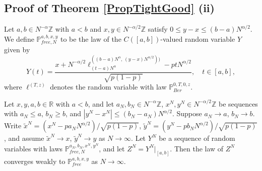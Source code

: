 \subsection{Proof of Theorem \ref{PropTightGood} (ii)}

\begin{definition}\label{scaledRW}
	Let $a,b\in N^{-\alpha}\mathbb{Z}$ with $a<b$ and $x,y\in N^{-\alpha/2}\mathbb{Z}$ satisfy $0\leq y-x \leq (b-a)N^{\alpha/2}$. We define $\mathbb{P}^{a,b,x,y}_{free,N}$ to be the law of the $C([a,b])$-valued random variable $Y$ given by
	\[
	Y(t) = \frac{x + N^{-\alpha/2}\ell^{((b-a)N^\alpha,\,(y-x)N^{\alpha/2}))}_{(t-a)N^\alpha} - ptN^{\alpha/2}}{\sqrt{p(1-p)}}, \quad t\in [a,b],
	\]
	where $\ell^{(T,z)}$ denotes the random variable with law $\mathbb{P}^{0,T,0,z}_{Ber}$.
\end{definition}

\begin{lemma}\label{scaledRWbb}
	Let $x,y,a,b\in \mathbb{R}$ with $a<b$, and let $a_N,b_N\in N^{-\alpha}\mathbb{Z}$, $x^N,y^N \in N^{-\alpha/2}\mathbb{Z}$ be sequences with $a_N \leq a$, $b_N\geq b$, and $|y^N-x^N| \leq (b_N-a_N)N^{\alpha/2}$. Suppose $a_N\to a$, $b_N\to b$. Write $\tilde{x}^N = (x^N - pa_NN^{\alpha/2})/\sqrt{p(1-p)}$, $\tilde{y}^N = (y^N - pb_NN^{\alpha/2})/\sqrt{p(1-p)}$, and assume $\tilde{x}^N \to x$, $\tilde{y}^N\to y$ as $N\to\infty$. Let $Y^N$ be a sequence of random variables with laws $\mathbb{P}^{a_N,b_N,x^N,y^N}_{free,N}$, and let $Z^N = Y^N|_{[a,b]}$. Then the law of $Z^N$ converges weakly to $\mathbb{P}^{a,b,x,y}_{free}$ as $N\to\infty$.
\end{lemma}

